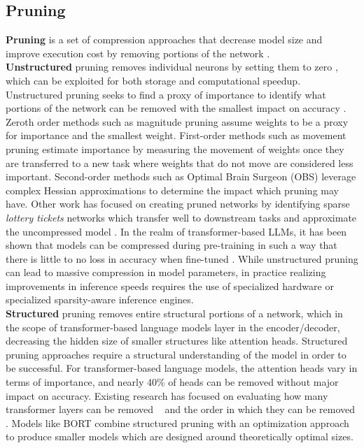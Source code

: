 \subsection{Pruning}
\noindent\textbf{Pruning} is a set of compression approaches that decrease model size and improve execution cost by removing portions of the network \cite{LeCun1989OptimalBD}. \\
\textbf{Unstructured} pruning removes individual neurons by setting them to zero \cite{Han2015ADN}, which can be exploited for both storage and computational speedup. Unstructured pruning seeks to find a proxy of importance to identify what portions of the network can be removed with the smallest impact on accuracy \cite{LeCun1989OptimalBD}. Zeroth order methods such as magnitude pruning \cite{Han2015ADN, Gale2019TheSO} assume weights to be a proxy for importance and the smallest weight. First-order methods such as movement pruning \cite{Sanh2020MovementPA} estimate importance by measuring the movement of weights once they are transferred to a new task where weights that do not move are considered less important. Second-order \cite{LeCun1989OptimalBD, hassibi1993second, Singh2020WoodFisherES} methods such as Optimal Brain Surgeon (OBS) leverage complex Hessian approximations to determine the impact which pruning may have. Other work has focused on creating pruned networks by identifying sparse \textit{lottery tickets} networks which transfer well to downstream tasks and approximate the uncompressed model \cite{Chen2020TheLT, Frankle2019TheLT}. In the realm of transformer-based LLMs, it has been shown that models can be compressed during pre-training in such a way that there is little to no loss in accuracy when fine-tuned \cite{zafrir2021prune}. While unstructured pruning can lead to massive compression in model parameters, in practice realizing improvements in inference speeds requires the use of specialized hardware or specialized sparsity-aware inference engines. \\
\textbf{Structured} pruning \cite{LeCun1989OptimalBD} removes entire structural portions of a network, which in the scope of transformer-based language models layer in the encoder/decoder, decreasing the hidden size of smaller structures like attention heads. Structured pruning approaches require a structural understanding of the model in order to be successful. For transformer-based language models, the attention heads vary in terms of importance, and nearly 40\% of heads can be removed without major impact on accuracy\cite{Michel2019AreSH,Voita2019AnalyzingMS}. Existing research has focused on evaluating how many transformer layers can be removed ~\cite{Sridhar2020UndividedAA} and the order in which they can be removed \cite{DBLP:journals/corr/abs-2004-03844}. Models like BORT \cite{DBLP:journals/corr/abs-2010-10499} combine structured pruning with an optimization approach to produce smaller models which are designed around theoretically optimal sizes.\\

